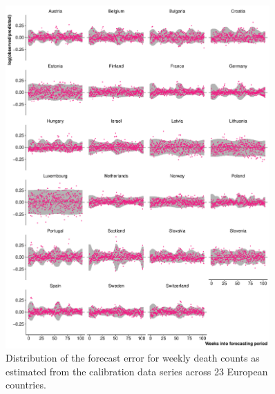 \documentclass[12pt]{article}
\begin{document}
\begin{figure}[ht!]
    \centering
    \includegraphics[width=0.9\textwidth]{fig/21-calibrationbycountry.pdf}
     \caption{Distribution of the forecast error for weekly death counts as estimated from the calibration data series across 23 European countries.}
     \label{fig:frcst_error_dstr_appendix}
\end{figure}
\end{document}
